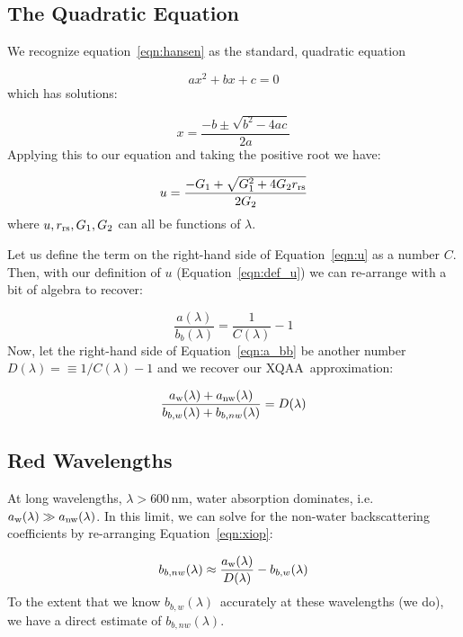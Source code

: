 \documentclass{article}
\newcommand{\rrs}{\ensuremath{r_{\rm rs}}}
\newcommand{\abs}{\ensuremath{a(\lambda)}} %
\newcommand{\bb}{\ensuremath{b_b(\lambda)}} %
\newcommand{\bbw}{\ensuremath{b_{b,w}(\lambda)}} %
\newcommand{\bbnw}{\ensuremath{b_{b,nw}(\lambda)}} %
\newcommand{\aw}{\ensuremath{a_{\rm w} (\lambda)}}
\newcommand{\anw}{\ensuremath{a_{\rm nw} (\lambda)}}
\newcommand{\dl}{\ensuremath{D(\lambda)}}
\newcommand{\name}{XQAA}
\begin{document}
\subsection{The Quadratic Equation}

We recognize equation~\ref{eqn:hansen} as the standard,
quadratic equation 

\begin{equation}
    a x^2 + b x + c = 0
\end{equation}
which has solutions:

\begin{equation}
    x = \frac{-b \pm \sqrt{b^2 - 4ac}}{2a}
\end{equation}
Applying this to our equation and taking the positive
root we have:


\begin{equation}
    u = \frac{-G_1 + \sqrt{G_1^2 + 4G_2 \rrs}}{2 G_2}
    \label{eqn:u}
\end{equation}
where $u, \rrs, G_1, G_2$ can all be functions of 
$\lambda$.

Let us define the term on the right-hand side of
Equation~\ref{eqn:u} as a number $C$.
Then, with our definition of $u$ (Equation~\ref{eqn:def_u})
we can re-arrange with a bit of algebra to recover:

\begin{equation}
    \frac{\abs}{\bb} = \frac{1}{C(\lambda)} - 1
    \label{eqn:a_bb}
\end{equation}
Now, let the right-hand side of Equation~\ref{eqn:a_bb}
be another number $D(\lambda) = \equiv 1/C(\lambda) - 1$ and we recover
our \name\ approximation:

\begin{equation}
    \frac{\aw + \anw}{\bbw  + \bbnw} = \dl
    \label{eqn:xiop}
\end{equation}


\subsection{Red Wavelengths}

At long wavelengths, $\lambda > 600$\,nm, water 
absorption dominates, i.e.\ $\aw \gg \anw$.  
In this
limit, we can solve for the non-water backscattering
coefficients by re-arranging Equation~\ref{eqn:xiop}:

\begin{equation}
    \bbnw \approx \frac{\aw}{\dl} - \bbw
    \label{eqn:bbnw}
\end{equation}
To the extent that we know \bbw\ accurately at these
wavelengths (we do), we have a direct estimate of \bbnw.
\end{document}

